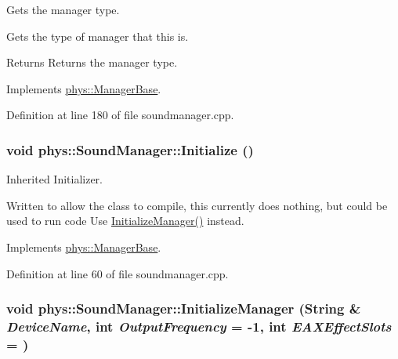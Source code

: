 Gets the manager type. 

Gets the type of manager that this is. \begin{DoxyReturn}{Returns}
Returns the manager type. 
\end{DoxyReturn}


Implements \hyperlink{classphys_1_1ManagerBase_aff400b6599db635e24796d8221e9a0e3}{phys::ManagerBase}.



Definition at line 180 of file soundmanager.cpp.

\hypertarget{classphys_1_1SoundManager_ae6d3957f965b54e06ec540e903cec68d}{
\subsubsection[{Initialize}]{\setlength{\rightskip}{0pt plus 5cm}void phys::SoundManager::Initialize ()}}
\label{d1/dc4/classphys_1_1SoundManager_ae6d3957f965b54e06ec540e903cec68d}


Inherited Initializer. 

Written to allow the class to compile, this currently does nothing, but could be used to run code Use \hyperlink{classphys_1_1SoundManager_aa0fc07170611851f3fa888c8e28d99df}{InitializeManager()} instead. 

Implements \hyperlink{classphys_1_1ManagerBase_a57dd8e54e767427d5bdcc86dc66d73ed}{phys::ManagerBase}.



Definition at line 60 of file soundmanager.cpp.

\hypertarget{classphys_1_1SoundManager_aa0fc07170611851f3fa888c8e28d99df}{
\subsubsection[{InitializeManager}]{\setlength{\rightskip}{0pt plus 5cm}void phys::SoundManager::InitializeManager ({\bf String} \& {\em DeviceName}, \/  int {\em OutputFrequency} = {\ttfamily -\/1}, \/  int {\em EAXEffectSlots} = {})}}
\label{d1/dc4/classphys_1_1SoundManager_aa0fc07170611851f3fa888c8e28d99df}


